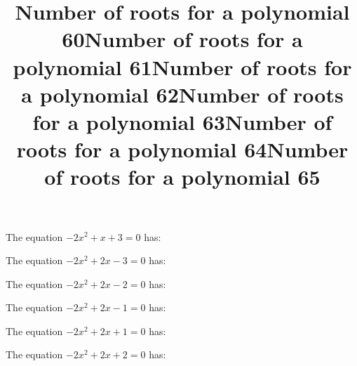 \documentclass{article}
\begin{document}
\begin{category}
\begin{question}[multichoice]


\end{question}
\begin{question}[multichoice]
\title{Number of roots for a polynomial 60}
The equation $- 2 x^{2} + x + 3=0$ has:



\end{question}
\begin{question}[multichoice]
\title{Number of roots for a polynomial 61}
The equation $- 2 x^{2} + 2 x - 3=0$ has:



\end{question}
\begin{question}[multichoice]
\title{Number of roots for a polynomial 62}
The equation $- 2 x^{2} + 2 x - 2=0$ has:



\end{question}
\begin{question}[multichoice]
\title{Number of roots for a polynomial 63}
The equation $- 2 x^{2} + 2 x - 1=0$ has:



\end{question}
\begin{question}[multichoice]
\title{Number of roots for a polynomial 64}
The equation $- 2 x^{2} + 2 x + 1=0$ has:



\end{question}
\begin{question}[multichoice]
\title{Number of roots for a polynomial 65}
The equation $- 2 x^{2} + 2 x + 2=0$ has:




\end{question}
\end{category}
\end{document}
